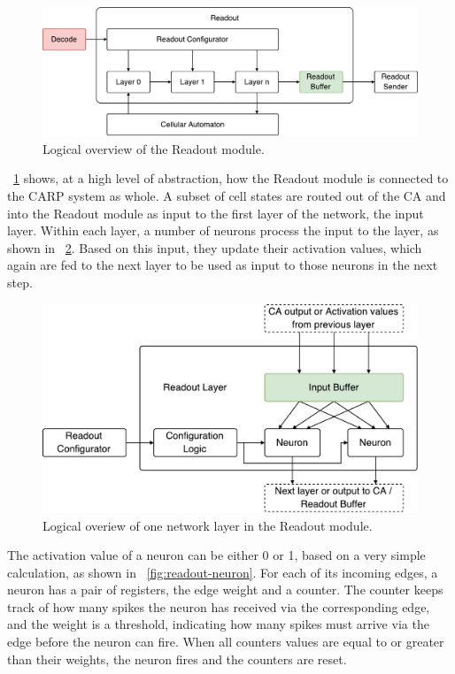 \begin{figure}[ht]
  \centering
  \includegraphics[width=\linewidth]{fig/readout-io}
  \caption{Logical overview of the Readout module.}
  \label{fig:readout-io}
\end{figure}

\figurename~\ref{fig:readout-io} shows, at a high level of abstraction, how the
Readout module is connected to the CARP system as whole. A subset of cell states
are routed out of the CA and into the Readout module as input to the first layer
of the network, the input layer. Within each layer, a number of neurons process
the input to the layer, as shown in \figurename~\ref{fig:readout-layer}. Based
on this input, they update their activation values, which again are fed to the
next layer to be used as input to those neurons in the next step.

\begin{figure}[ht]
  \centering
  \includegraphics[width=0.8\linewidth]{fig/readout-layer}
  \caption{Logical overiew of one network layer in the Readout module.}
  \label{fig:readout-layer}
\end{figure}

The activation value of a neuron can be either 0 or 1, based on a very simple
calculation, as shown in \figurename~\ref{fig:readout-neuron}. For each of its
incoming edges, a neuron has a pair of registers, the edge weight and a counter.
The counter keeps track of how many spikes the neuron has received via the
corresponding edge, and the weight is a threshold, indicating how many spikes
must arrive via the edge before the neuron can fire. When all counters values
are equal to or greater than their weights, the neuron fires and the counters
are reset.

